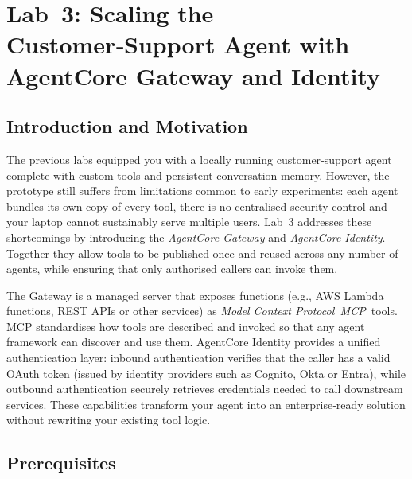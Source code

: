 

\chapter{Lab 3: Scaling the Customer‑Support Agent with AgentCore Gateway and Identity}
\label{chap:Lab 3: Scaling the Customer‑Support Agent with AgentCore Gateway and Identity}

\section{Introduction and Motivation}

The previous labs equipped you with a locally running customer‑support agent
complete with custom tools and persistent conversation memory.  However, the
prototype still suffers from limitations common to early experiments: each
agent bundles its own copy of every tool, there is no centralised security
control and your laptop cannot sustainably serve multiple users.  Lab 3
addresses these shortcomings by introducing the \emph{AgentCore Gateway} and
\emph{AgentCore Identity}.  Together they allow tools to be published once
and reused across any number of agents, while ensuring that only authorised
callers can invoke them.

The Gateway is a managed server that exposes functions (e.g., AWS Lambda
functions, REST APIs or other services) as \emph{Model Context Protocol
\,MCP\,} tools.  MCP standardises how tools are described and invoked so
that any agent framework can discover and use them.  AgentCore Identity
provides a unified authentication layer: inbound authentication verifies
that the caller has a valid OAuth token (issued by identity providers
such as Cognito, Okta or Entra), while outbound authentication securely
retrieves credentials needed to call downstream services.  These
capabilities transform your agent into an enterprise‑ready solution
without rewriting your existing tool logic.

\section{Prerequisites}

